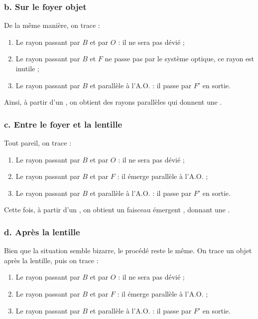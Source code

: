 \documentclass[10pt,a5paper,notitlepage]{book}
\begin{document}
\setcounter{subsubsection}{0}
\subsubsection{b. Sur le foyer objet}
De la même manière, on trace :
\begin{enumerate}
    \item Le rayon passant par $B$ et par $O$ : il ne sera pas dévié ;
    \item Le rayon passant par $B$ et $F$ ne passe pas par le système optique,
        ce rayon est inutile ;
    \item Le rayon passant par $B$ et parallèle à l'A.O. : il passe par $F'$ en
        sortie.
\end{enumerate}

Ainsi, à partir d'un , on obtient des rayons parallèles
qui donnent une .

\setcounter{subsubsection}{0}
\subsubsection{c. Entre le foyer et la lentille}\label{eflc}
Tout pareil, on trace :
\begin{enumerate}
    \item Le rayon passant par $B$ et par $O$ : il ne sera pas dévié ;
    \item Le rayon passant par $B$ et par $F$ : il émerge parallèle à l'A.O. ;
    \item Le rayon passant par $B$ et parallèle à l'A.O. : il passe par $F'$ en
        sortie.
\end{enumerate}

Cette fois, à partir d'un , on obtient un faisceau
émergent , donnant une .

\setcounter{subsubsection}{0}
\subsubsection{d. Après la lentille}
Bien que la situation semble bizarre, le procédé reste le même. On
trace un objet après la lentille, puis on trace :
\begin{enumerate}
    \item Le rayon passant par $B$ et par $O$ : il ne sera pas dévié ;
    \item Le rayon passant par $B$ et par $F$ : il émerge parallèle à l'A.O. ;
    \item Le rayon passant par $B$ et parallèle à l'A.O. : il passe par $F'$ en
        sortie.
\end{enumerate}
\end{document}
